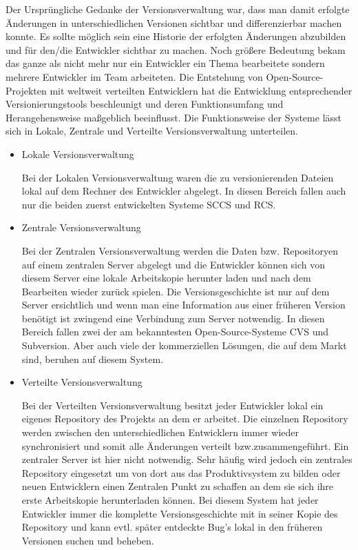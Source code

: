 Der Ursprüngliche Gedanke der Versionsverwaltung war, dass man damit erfolgte Änderungen in unterschiedlichen Versionen sichtbar und differenzierbar machen konnte. Es sollte möglich sein eine Historie der erfolgten Änderungen abzubilden und für den/die Entwickler sichtbar zu machen. Noch größere Bedeutung bekam das ganze als nicht mehr nur ein Entwickler ein Thema bearbeitete sondern mehrere Entwickler im Team arbeiteten. Die Entstehung von Open-Source-Projekten mit weltweit verteilten Entwicklern hat die Entwicklung entsprechender Versionierungstools beschleunigt und deren Funktionsumfang und Herangehensweise maßgeblich beeinflusst.
Die Funktionsweise der Systeme lässt sich in Lokale, Zentrale und Verteilte Versionsverwaltung unterteilen. 
\begin{itemize}
\item{Lokale Versionsverwaltung}

Bei der Lokalen Versionsverwaltung waren die zu versionierenden Dateien lokal auf dem Rechner des Entwickler abgelegt. In diesen Bereich fallen auch nur die beiden zuerst entwickelten Systeme SCCS und RCS. 


\item{Zentrale Versionsverwaltung}

Bei der Zentralen Versionsverwaltung werden die Daten bzw. Repositoryen auf einem zentralen Server abgelegt und die Entwickler können sich von diesem Server eine lokale Arbeitskopie herunter laden und nach dem Bearbeiten wieder zurück spielen. Die Versionsgeschichte ist nur auf dem Server ersichtlich und wenn man eine Information aus einer früheren Version benötigt ist zwingend eine Verbindung zum Server notwendig. In diesen Bereich fallen zwei der am bekanntesten Open-Source-Systeme CVS und Subversion. Aber auch viele der kommerziellen Lösungen, die auf dem Markt sind, beruhen auf diesem System.



\item{Verteilte Versionsverwaltung}

Bei der Verteilten Versionsverwaltung besitzt jeder Entwickler lokal ein eigenes Repository des Projekts an dem er arbeitet. Die einzelnen Repository werden zwischen den unterschiedlichen Entwicklern immer wieder synchronisiert und somit alle Änderungen verteilt bzw.\@	 zusammengeführt. Ein zentraler Server ist hier nicht notwendig. Sehr häufig wird jedoch ein zentrales Repository eingesetzt um von dort aus das Produktivsystem zu bilden oder neuen Entwicklern einen Zentralen Punkt zu schaffen an dem sie sich ihre erste Arbeitskopie herunterladen können. Bei diesem System hat jeder Entwickler immer die komplette Versionsgeschichte mit in seiner Kopie des Repository und kann evtl. später entdeckte Bug's lokal in den früheren Versionen suchen und beheben.
\end{itemize}

